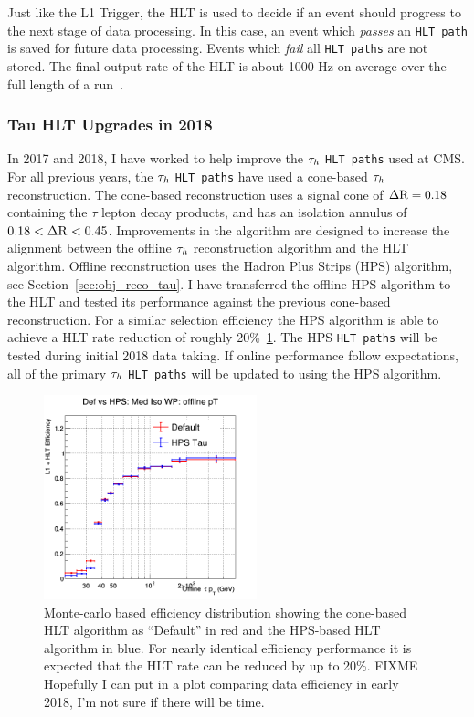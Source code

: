 Just like the L1 Trigger, the HLT is used to decide if an event should progress
to the next stage of data processing. In this case, an event which \textit{passes}
an \texttt{HLT path} is saved for future data processing. Events which \textit{fail}
all \texttt{HLT paths} are not stored. The final output rate of the HLT is
about 1000 Hz on average over the full length of a run~\cite{cms_daq_7097437}.



\subsubsection{Tau HLT Upgrades in 2018}
In 2017 and 2018, I have worked to help improve the $\tau_{h}$ \texttt{HLT paths} 
used at CMS. For all previous years, the $\tau_{h}$ \texttt{HLT paths} have used
a cone-based $\tau_{h}$ reconstruction. The cone-based reconstruction 
uses a signal cone of $\Delta \mathrm{R} = 0.18$ containing the $\tau$ lepton decay products,
and has an isolation annulus of $0.18 < \Delta \mathrm{R} < 0.45$. Improvements in the
algorithm are designed to increase the alignment between the offline $\tau_{h}$
reconstruction algorithm and the HLT algorithm. Offline reconstruction uses
the Hadron Plus Strips (HPS) algorithm, see Section~\ref{sec:obj_reco_tau}.
I have transferred the offline HPS algorithm to the HLT and tested its
performance against the previous cone-based reconstruction. For a similar
selection efficiency the HPS algorithm is able to achieve a HLT rate
reduction of roughly 20\%~\ref{fig:hlt_hps}. The HPS \texttt{HLT paths}
will be tested during initial 2018 data taking. If online performance
follow expectations, all of the primary $\tau_{h}$ \texttt{HLT paths}
will be updated to using the HPS algorithm.

\begin{figure}[htbp]
\centering
     \includegraphics[width=0.55\textwidth]{cms_and_lhc/plots/eff_Def_vs_HPS_Med_Iso_WP_offline_pT.png}
     \caption{
Monte-carlo based efficiency distribution showing the cone-based HLT
algorithm as ``Default'' in red and the HPS-based HLT algorithm
in blue. For nearly identical efficiency performance it is expected that
the HLT rate can be reduced by up to 20\%. FIXME Hopefully I can put in
a plot comparing data efficiency in early 2018, I'm not sure if there
will be time.
     }
     \label{fig:hlt_hps}
\end{figure}


